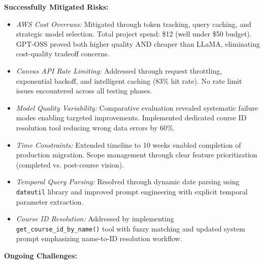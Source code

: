 \documentclass{article}
\begin{document}
\textbf{Successfully Mitigated Risks:}
\begin{itemize}
    \item \textit{AWS Cost Overruns:} Mitigated through token tracking, query caching, and strategic model selection. Total project spend: \$12 (well under \$50 budget). GPT-OSS proved both higher quality AND cheaper than LLaMA, eliminating cost-quality tradeoff concerns.
    
    \item \textit{Canvas API Rate Limiting:} Addressed through request throttling, exponential backoff, and intelligent caching (83\% hit rate). No rate limit issues encountered across all testing phases.
    
    \item \textit{Model Quality Variability:} Comparative evaluation revealed systematic failure modes enabling targeted improvements. Implemented dedicated course ID resolution tool reducing wrong data errors by 60\%.
    
    \item \textit{Time Constraints:} Extended timeline to 10 weeks enabled completion of production migration. Scope management through clear feature prioritization (completed vs. post-course vision).
    
    \item \textit{Temporal Query Parsing:} Resolved through dynamic date parsing using \texttt{dateutil} library and improved prompt engineering with explicit temporal parameter extraction.
    
    \item \textit{Course ID Resolution:} Addressed by implementing \texttt{get\_course\_id\_by\_name()} tool with fuzzy matching and updated system prompt emphasizing name-to-ID resolution workflow.
\end{itemize}

\textbf{Ongoing Challenges:}
\end{document}
